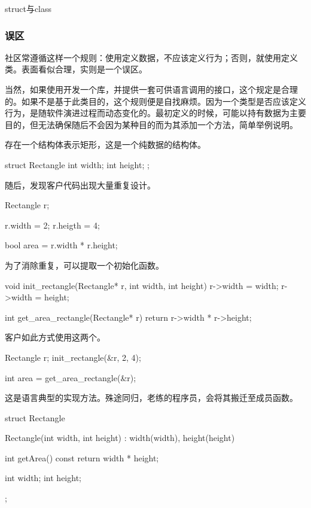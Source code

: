 \begin{content}
\begin{episode}{struct与class}
\begin{content}
\subsubsection{误区}

社区常遵循这样一个规则：使用定义数据，不应该定义行为；否则，就使用定义类。表面看似合理，实则是一个误区。

当然，如果使用\cpp{}开发一个库，并提供一套可供\clang{}语言调用的接口，这个规定是合理的。如果不是基于此类目的，这个规则便是自找麻烦。因为一个类型是否应该定义行为，是随软件演进过程而动态变化的。最初定义的时候，可能以持有数据为主要目的，但无法确保随后不会因为某种目的而为其添加一个方法，简单举例说明。

存在一个结构体表示矩形，这是一个纯数据的结构体。

\begin{c++}
struct Rectangle {
  int width;
  int height;
};
\end{c++}

随后，发现客户代码出现大量重复设计。

\begin{c++}
Rectangle r;

r.width = 2;
r.heigth = 4;

bool area = r.width * r.height;
\end{c++}

为了消除重复，可以提取一个初始化函数。

\begin{c++}
void init_rectangle(Rectangle* r, int width, int height) {
  r->width = width;
  r->width = height;
}

int get_area_rectangle(Rectangle* r) {
  return r->width * r->height;
}
\end{c++}

客户如此方式使用这两个。

\begin{c++}
Rectangle r;
init_rectangle(&r, 2, 4);

int area = get_area_rectangle(&r);
\end{c++}

这是\clang{}语言典型的实现方法。殊途同归，老练的程序员，会将其搬迁至成员函数。

\begin{c++}
struct Rectangle {
  Rectangle(int width, int height) : width(width), height(height) {
  }

  int getArea() const {
    return width * height;
  }

  int width;
  int height;
};
\end{c++}


\end{content}
\end{episode}
\end{content}
